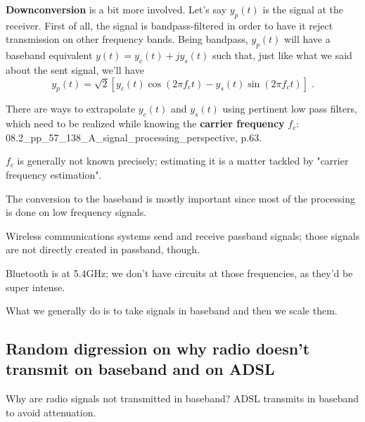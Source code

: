 \documentclass[a4paper, 12pt]{book}
\begin{document}
\clearpage %

\textbf{Downconversion} is a bit more involved. Let's say $y_p(t)$ is the signal at the receiver. First of all, the signal is bandpass-filtered in order to have it reject transmission on other frequency bands. Being bandpass, $y_p(t)$ will have a baseband equivalent $y(t) = y_c(t) + j y_s(t)$ such that, just like what we said about the sent signal, we'll have
\begin{equation}
y_p(t) = \sqrt{2} [ y_c(t) \cos(2\pi f_c t) - y_s(t) \sin(2\pi f_c t) ] \;. \tag{2.6}
\end{equation}

\begin{tcolorbox}[sharp corners, boxrule=0pt, leftrule=2pt, colframe=green!60!black, colback=green!5, left=5pt, top=3pt, bottom=3pt]
    There are ways to extrapolate $y_c(t)$ and $y_s(t)$ using pertinent low pass filters, which need to be realized while knowing the \textbf{carrier frequency} $f_c$:
    \textcolor{green!60!black}{08.2\_pp\_57\_138\_A\_signal\_processing\_perspective, p.63.}
    
    $f_c$ is generally not known precisely; estimating it is a matter tackled by "carrier frequency estimation".
\end{tcolorbox}

The conversion to the baseband is mostly important since most of the processing is done on low frequency signals.

Wireless communications systems send and receive passband signals; those signals are not directly created in passband, though.

\begin{tcolorbox}[frame hidden, sharp corners, boxrule=0pt, leftrule=2pt, colframe=green!60!black, colback=green!5, left=5pt, top=3pt, bottom=3pt]
    Bluetooth is at 5.4GHz; we don't have circuits at those frequencies, as they'd be super intense.
\end{tcolorbox}

What we generally do is to take signals in baseband and then we scale them.

\subsection{Random digression on why radio doesn't transmit on baseband and on ADSL}

\begin{tcolorbox}[frame hidden, sharp corners, boxrule=0pt, leftrule=2pt, colframe=green!60!black, colback=green!5, left=5pt, top=3pt, bottom=3pt]
    Why are radio signals not transmitted in baseband?
    ADSL transmits in baseband to avoid attenuation.
\end{tcolorbox}
\end{document}
